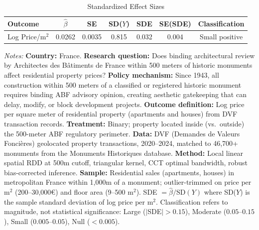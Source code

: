 \begin{table}[t]
\centering
\caption{Standardized Effect Sizes}
\label{tab:sde}
\begin{tabular}{lcccccc}
\toprule
Outcome & $\hat{\beta}$ & SE & SD($Y$) & SDE & SE(SDE) & Classification \\
\midrule
Log Price/m$^2$ & 0.0262 & 0.0035 & 0.815 & 0.032 & 0.004 & Small positive \\
\bottomrule
\end{tabular}
\begin{tablenotes}
\item \textit{Notes:} \textbf{Country:} France. \textbf{Research question:} Does binding architectural review by Architectes des B\^{a}timents de France within 500 meters of historic monuments affect residential property prices? \textbf{Policy mechanism:} Since 1943, all construction within 500 meters of a classified or registered historic monument requires binding ABF advisory opinion, creating aesthetic gatekeeping that can delay, modify, or block development projects. \textbf{Outcome definition:} Log price per square meter of residential property (apartments and houses) from DVF transaction records. \textbf{Treatment:} Binary; property located inside (vs.~outside) the 500-meter ABF regulatory perimeter. \textbf{Data:} DVF (Demandes de Valeurs Fonci\`eres) geolocated property transactions, 2020--2024, matched to 46,700+ monuments from the Monuments Historiques database. \textbf{Method:} Local linear spatial RDD at 500m cutoff, triangular kernel, CCT optimal bandwidth, robust bias-corrected inference. \textbf{Sample:} Residential sales (apartments, houses) in metropolitan France within 1,000m of a monument; outlier-trimmed on price per m$^2$ (200--30,000\euro) and floor area (9--500 m$^2$). SDE $= \hat{\beta} / \text{SD}(Y)$ where SD($Y$) is the sample standard deviation of log price per m$^2$. Classification refers to magnitude, not statistical significance: Large ($|$SDE$| > 0.15$), Moderate ($0.05$--$0.15$), Small ($0.005$--$0.05$), Null ($< 0.005$).
\end{tablenotes}
\end{table}
